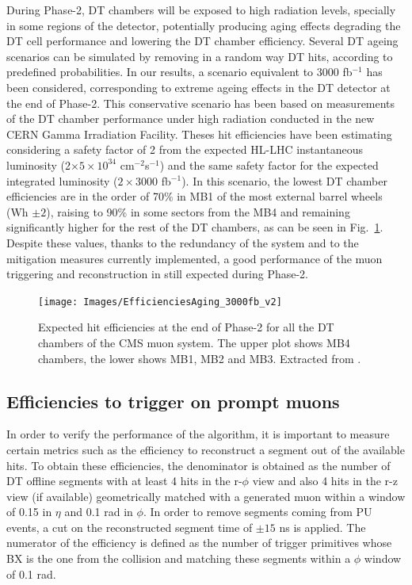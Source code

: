 \documentclass[../main.tex]{subfiles}
\begin{document}
During Phase-2, DT chambers will be exposed to high radiation levels, specially in some regions of the detector, potentially producing aging effects degrading the DT cell performance and lowering the DT chamber efficiency. Several DT ageing scenarios can be simulated by removing in a random way DT hits, according to predefined probabilities. In our results, a scenario equivalent to 3000 fb${}^{-1}$ has been considered, corresponding to extreme ageing effects in the DT detector at the end of Phase-2. This conservative scenario has been based on measurements of the DT chamber performance under high radiation conducted in the new CERN Gamma Irradiation Facility. Theses hit efficiencies have been estimating considering a safety factor of 2 from the expected HL-LHC instantaneous luminosity (2$\times 5\times 10^{34}$ cm${}^{-2}$s${}^{-1}$) and the same safety factor for the expected integrated luminosity ($2\times$3000 fb${}^{-1}$). In this scenario, the lowest DT chamber efficiencies are in the order of 70$\%$ in MB1 of the most external barrel wheels (Wh $\pm2$), raising to 90$\%$ in some sectors from the MB4 and remaining significantly higher for the rest of the DT chambers, as can be seen in Fig.~\ref{dts:fig:ageing}. Despite these values, thanks to the redundancy of the system and to the mitigation measures currently implemented, a good performance of the muon triggering and reconstruction in still expected during Phase-2.

\begin{figure}[h!]
\begin{center}
\texttt{[image: Images/EfficienciesAging\_3000fb\_v2]}
\end{center}
\caption[Expected ageing scenario]{Expected hit efficiencies at the end of Phase-2 for all the DT chambers of the CMS muon system. The upper plot shows MB4 chambers, the lower shows MB1, MB2 and MB3. Extracted from \cite{dts:intro:am}.}
\label{dts:fig:ageing}
\end{figure}

\subsection{Efficiencies to trigger on prompt muons}

In order to verify the performance of the algorithm, it is important to measure certain metrics such as the efficiency to reconstruct a segment out of the available hits. To obtain these efficiencies, the denominator is obtained as the number of DT offline segments with at least 4 hits in the r-$\phi$ view and also 4 hits in the r-z view (if available) geometrically matched with a generated muon within a window of 0.15 in $\eta$ and 0.1 rad in $\phi$. In order to remove segments coming from PU events, a cut on the reconstructed segment time of $\pm 15$ ns is applied. The numerator of the efficiency is defined as the number of trigger primitives whose BX is the one from the collision and matching these segments within a $\phi$ window of 0.1 rad.
\end{document}
